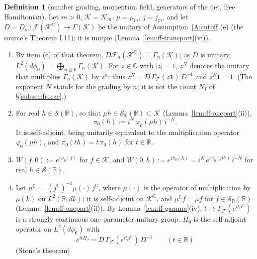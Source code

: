 \documentclass[11pt,a4paper]{article}
\theoremstyle{plain}
\theoremstyle{definition}
\newtheorem{definition}[theorem]{Definition}
\theoremstyle{plain}
\theoremstyle{definition}
\newcommand{\R}{\mathbb{R}}
\newcommand{\C}{\mathbb{C}}
\begin{document}
\begin{definition}[number grading, momentum field, generators of the net, free Hamiltonian]
\label{def:ff-objects}
Let $m>0$, $\mathcal K=\mathcal K_m$, $\mu=\mu_m$, $j=j_m$, and let $D=D_m:\mathcal F(\mathcal
K^{\C})\to\Gamma(\mathcal K)$ be the unitary of Assumption~\ref{A:cutoff}(e) (the source's
Theorem I.11); it is unique (Lemma~\ref{lem:ff-transport}(vi)).
\begin{enumerate}
\item[\textup{(a)}] By item (c) of that theorem, $D\mathcal F_n(\mathcal K^{\C})=
\Gamma_n(\mathcal K)$; as $D$ is unitary, $L^2(d\phi_0)=\bigoplus_{n\ge0}\Gamma_n(\mathcal K)$.
For $z\in\C$ with $|z|=1$, $z^N$ denotes the unitary that multiplies $\Gamma_n(\mathcal K)$ by
$z^n$; thus $z^N=D\,\Gamma_{\!\mathcal F}(z\mathbf 1)\,D^{-1}$ and $z^N1=1$.  (The exponent $N$
stands for the grading by $n$; it is not the count $N_I$ of \S\ref{subsec:freeze}.)
\item[\textup{(b)}] For real $h\in\mathcal S(\R)$, so that $\mu h\in\mathcal S_\R(\R)\subset
\mathcal K$ (Lemma~\ref{lem:ff-onepart}(ii)),
\[
 \pi_0(h):=i^N\,\varphi_0(\mu h)\,i^{-N} .
\]
It is self-adjoint, being unitarily equivalent to the multiplication operator
$\varphi_0(\mu h)$, and $\pi_0(th)=t\,\pi_0(h)$ for $t\in\R$.
\item[\textup{(c)}] $W(f,0):=e^{i\varphi_0(f)}$ for $f\in\mathcal K$, and
$W(0,h):=e^{i\pi_0(h)}=i^N\,e^{i\varphi_0(\mu h)}\,i^{-N}$ for real $h\in\mathcal S(\R)$.
\item[\textup{(d)}] Let $\mu^{\C}:=(j^{\C})^{-1}\mu(\cdot)\,j^{\C}$, where $\mu(\cdot)$ is the
operator of multiplication by $\mu(k)$ on $L^2(\R,dk)$; it is self-adjoint on
$\mathcal K^{\C}$, and $\mu^{\C}f=\mu f$ for $f\in\mathcal S_\R(\R)$
(Lemma~\ref{lem:ff-onepart}(ii)).  By Lemma~\ref{lem:ff-gamma}(iv), $t\mapsto
\Gamma_{\!\mathcal F}(e^{it\mu^{\C}})$ is a strongly continuous one-parameter unitary group.
$H_0$ is the self-adjoint operator on $L^2(d\phi_0)$ with
\[
 e^{itH_0}=D\,\Gamma_{\!\mathcal F}(e^{it\mu^{\C}})\,D^{-1}\qquad(t\in\R)
\]
(Stone's theorem).
\end{enumerate}
\end{definition}
\end{document}
